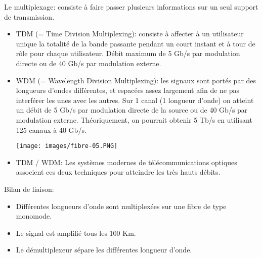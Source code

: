 \documentclass[a4paper]{article}
\begin{document}
Le multiplexage: consiste à faire passer plusieurs informations sur un seul support de transmission.
\begin{itemize}
    \item TDM (= Time Division Multiplexing): consiste à affecter à un utilisateur unique la totalité de la bande passante pendant un court instant et à tour de rôle pour chaque utilisateur. Débit maximum de 5 Gb/s par modulation directe ou de 40 Gb/s par modulation externe.
    \item WDM (= Wavelength Division Multiplexing): les signaux sont portés par des longueurs d'ondes différentes, et espacées assez largement afin de ne pas interférer les unes avec les autres. Sur 1 canal (1 longueur d'onde) on atteint un débit de 5 Gb/s par modulation directe de la source ou de 40 Gb/s par modulation externe. Théoriquement, on pourrait obtenir 5 Tb/s en utilisant 125 canaux à 40 Gb/s.
    \begin{center}
        \texttt{[image: images/fibre-05.PNG]}
    \end{center}
    \item TDM / WDM: Les systèmes modernes de télécommunications optiques associent ces deux techniques pour atteindre les très hauts débits.
\end{itemize}

Bilan de liaison:
\begin{itemize}
    \item Différentes longueurs d'onde sont multiplexées sur une fibre de type monomode.
    \item Le signal est amplifié tous les 100 Km.
    \item Le démultiplexeur sépare les différentes longueur d'onde.
\end{itemize}















\end{document}
